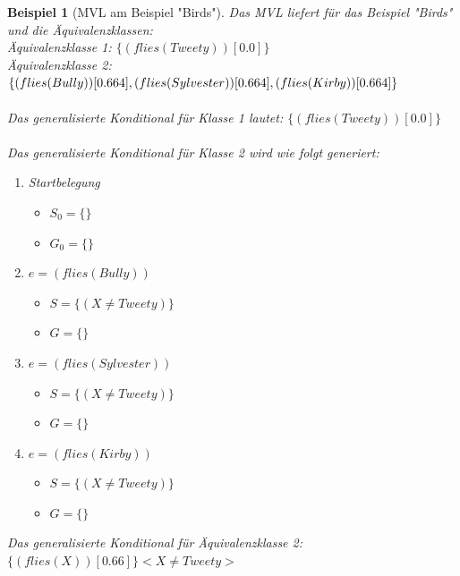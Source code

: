 \documentclass[a4paper, 11pt]{book}
\newtheorem{Bsp}{Beispiel}[section]
\begin{document}
\begin{Bsp}[MVL am Beispiel "{}Birds"{}]
	Das MVL liefert für das Beispiel "{}Birds"{} und die Äquivalenzklassen:\\
Äquivalenzklasse 1: $\{(flies(Tweety))[0.0]\}$\\
Äquivalenzklasse 2: $\{(flies(Bully))[0.664], (flies(Sylvester))[0.664],\\ (flies(Kirby))[0.664]\}$\\
\\
Das generalisierte Konditional für Klasse 1 lautet: $\{(flies(Tweety))[0.0]\}$\\
\\
Das generalisierte Konditional für Klasse 2 wird wie folgt generiert:

\begin{enumerate}
	\item Startbelegung
	\begin{itemize}
		\item $ S_0 = \{\}$ 
		\item $ G_0 = \{\} $
	\end{itemize}
	\item $ e = (flies(Bully)) $
	\begin{itemize}
		\item $ S = \{(X \neq Tweety)\}$ 
		\item $ G = \{\} $
	\end{itemize}
	\item $ e = (flies(Sylvester)) $
	\begin{itemize}
		\item $ S = \{(X \neq Tweety)\}$ 
		\item $ G = \{\} $
	\end{itemize}
		\item $ e = (flies(Kirby)) $
	\begin{itemize}
		\item $ S = \{(X \neq Tweety)\}$ 
		\item $ G = \{\} $
	\end{itemize}	
\end{enumerate}
Das generalisierte Konditional für Äquivalenzklasse 2:\\
 $\{(flies(X))[0.66]\} <X \neq Tweety>$\\
\end{Bsp}
\end{document}
